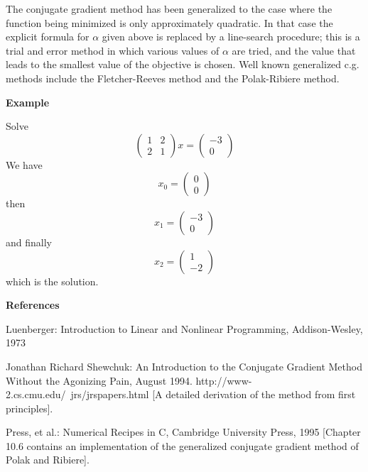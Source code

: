\documentclass[12pt]{article}
\begin{document}
The conjugate gradient method has been generalized to the case where the function being minimized is only approximately quadratic.  In that case the explicit formula for $\alpha$ given above is replaced by a line-search procedure; this is a trial and error method in which various values of $\alpha$ are tried, and the value that leads to the smallest value of the objective is chosen.  Well known generalized c.g. methods include the Fletcher-Reeves method and the Polak-Ribiere method.

\textbf{Example}

Solve \begin{displaymath}\left(\begin{array}{rr}
1 & 2\\
2 & 1
\end{array}\right) 
x = 
\left(\begin{array}{rr}
-3\\
0
\end{array}\right)
\end{displaymath}
We have \begin{displaymath}x_0 = \left(\begin{array}{rr} 
0\\
0 \end{array}\right)\end{displaymath}
then \begin{displaymath}x_1 = \left(\begin{array}{rr} 
-3\\
0 \end{array}\right)\end{displaymath}
and finally \begin{displaymath}x_2 = \left(\begin{array}{rr} 
1\\
-2 \end{array}\right)\end{displaymath} which is the solution.

\textbf{References}

Luenberger: Introduction to Linear and Nonlinear Programming, Addison-Wesley, 1973

Jonathan Richard Shewchuk: An Introduction to the Conjugate Gradient Method Without the Agonizing Pain, August 1994.  
{http://www-2.cs.cmu.edu/~jrs/jrspapers.html} [A detailed derivation of the method from first principles].

Press, et al.: Numerical Recipes in C, Cambridge University Press, 1995 [Chapter 10.6 contains an implementation of the generalized conjugate gradient method of Polak and Ribiere].
\end{document}
